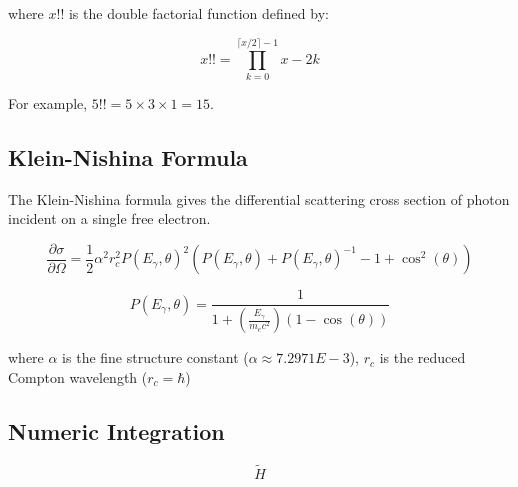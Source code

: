 \documentclass{article}
\numberwithin{equation}{subsection}
\begin{document}
where $x!!$ is the double factorial function defined by:

\begin{equation}
x!! = \prod_{k=0}^{\lceil x/2 \rceil - 1} x-2k
\end{equation}

For example, $5!! = 5 \times 3 \times 1 = 15$.

\subsection{Klein-Nishina Formula}

The Klein-Nishina formula gives the differential scattering cross section of photon incident on a single free electron.

\begin{equation}\label{klein_nishina}
\frac{\partial \sigma}{\partial \Omega} = \frac{1}{2}\alpha^2 r_c^2 P(E_\gamma, \theta)^2
\left( P(E_\gamma, \theta) + P(E_\gamma, \theta)^{-1} - 1 + \cos^2(\theta) \right)
\end{equation}

\begin{equation}\label{klein_nishina2}
P(E_\gamma, \theta) = \frac{1}{1 + (\frac{E_\gamma}{m_e c^2})(1-\cos(\theta))}
\end{equation}


\noindent
where $\alpha$ is the fine structure constant ($\alpha \approx 7.2971E-3$), $r_c$ is the reduced Compton wavelength ($r_c = \hbar$)

\subsection{Numeric Integration}

\begin{equation}
\tilde{H}
\end{equation}
\end{document}
